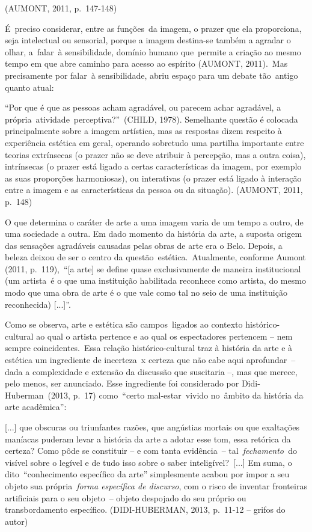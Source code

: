 \documentclass[
  letterpaper,
  a4paper,
  12pt]{scrbook}
\renewenvironment{quote}
  {\par\singlespacing\small\list{}{\rightmargin=0cm \leftmargin=4cm}%
   \item\relax}
  {\endlist}
\begin{document}
(AUMONT, 2011, p.~147-148) ~

É~preciso considerar, entre as funções~da imagem, o prazer que ela
proporciona, seja intelectual ou sensorial, porque a imagem destina-se
também a agradar o olhar, a~falar~à sensibilidade, domínio humano
que~permite a criação ao mesmo tempo em que abre caminho para acesso ao
espírito (AUMONT, 2011).~Mas precisamente por falar~à sensibilidade,
abriu espaço para um debate tão~antigo quanto atual:~ ~

\begin{quote}
``Por que é que as pessoas acham agradável, ou parecem achar agradável,
a própria~atividade~perceptiva?''~(CHILD, 1978). Semelhante questão é
colocada principalmente sobre a imagem artística, mas as respostas dizem
respeito à experiência estética em geral, operando sobretudo uma
partilha importante entre teorias extrínsecas (o prazer não se deve
atribuir à percepção, mas a outra coisa), intrínsecas (o prazer está
ligado a certas características da imagem, por exemplo as suas
proporções harmoniosas), ou interativas (o prazer está ligado à
interação entre a imagem e as características da pessoa ou da situação).
(AUMONT, 2011, p.~148)~ ~
\end{quote}

O que determina o caráter de arte a uma imagem varia de um tempo a
outro, de uma sociedade a outra. Em dado momento da história da arte, a
suposta origem das sensações agradáveis causadas pelas obras de arte era
o Belo. Depois, a beleza deixou de ser o centro da
questão~estética.~Atualmente, conforme Aumont (2011, p.~119),~``{[}a
arte{]} se define quase exclusivamente de maneira institucional (um
artista~é o que uma instituição habilitada reconhece como artista, do
mesmo modo que uma obra de arte é o que vale como tal no seio de uma
instituição reconhecida) {[}...{]}''.~

Como se observa, arte e estética são campos~ligados ao contexto
histórico-cultural ao qual o artista pertence e ao qual os espectadores
pertencem -- nem sempre coincidentes.~Essa relação histórico-cultural
traz à história da arte e à estética um ingrediente de incerteza~x
certeza que não cabe aqui aprofundar~-- dada a complexidade e extensão
da discussão que suscitaria --, mas que merece, pelo menos, ser
anunciado. Esse ingrediente foi considerado por Didi-Huberman~(2013,
p.~17) como~``certo mal-estar~vivido no~âmbito da história da arte
acadêmica'':~ ~

\begin{quote}
{[}...{]} que obscuras ou triunfantes razões, que angústias mortais ou
que exaltações maníacas puderam levar a história da arte a adotar esse
tom, essa retórica da certeza? Como pôde se constituir -- e com tanta
evidência~-- tal~\emph{fechamento~}do visível sobre o legível e de tudo
isso sobre o saber inteligível?~{[}...{]} Em suma, o dito~``conhecimento
específico da arte'' simplesmente acabou por impor a seu objeto sua
própria~\emph{forma específica de discurso}, com o risco de inventar
fronteiras artificiais para o seu objeto~-- objeto despojado do seu
próprio ou transbordamento específico. (DIDI-HUBERMAN, 2013, p.~11-12 --
grifos do autor)~ ~
\end{quote}
\end{document}
